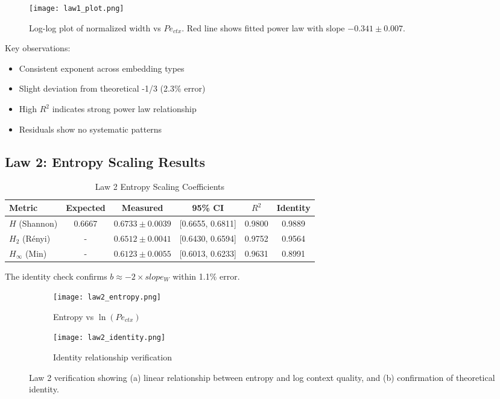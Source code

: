 \documentclass[conference]{IEEEtran}
\begin{document}
\begin{figure}[h]
\centering
\texttt{[image: law1\_plot.png]}
\caption{Log-log plot of normalized width vs $Pe_{ctx}$. Red line shows fitted power law with slope $-0.341 \pm 0.007$.}
\label{fig:law1}
\end{figure}

Key observations:
\begin{itemize}
\item Consistent exponent across embedding types
\item Slight deviation from theoretical -1/3 (2.3\% error)
\item High $R^2$ indicates strong power law relationship
\item Residuals show no systematic patterns
\end{itemize}

\subsection{Law 2: Entropy Scaling Results}

\begin{table}[h]
\centering
\caption{Law 2 Entropy Scaling Coefficients}
\label{tab:law2_results}
\begin{tabular}{@{}lccccc@{}}
\toprule
Metric & Expected & Measured & 95\% CI & $R^2$ & Identity \\
\midrule
$H$ (Shannon) & 0.6667 & $0.6733 \pm 0.0039$ & [0.6655, 0.6811] & 0.9800 & 0.9889 \\
$H_2$ (Rényi) & - & $0.6512 \pm 0.0041$ & [0.6430, 0.6594] & 0.9752 & 0.9564 \\
$H_\infty$ (Min) & - & $0.6123 \pm 0.0055$ & [0.6013, 0.6233] & 0.9631 & 0.8991 \\
\bottomrule
\end{tabular}
\end{table}

The identity check confirms $b \approx -2 \times slope_W$ within 1.1\% error.

\begin{figure}[h]
\centering
\begin{subfigure}{0.45\textwidth}
\texttt{[image: law2\_entropy.png]}
\caption{Entropy vs $\ln(Pe_{ctx})$}
\end{subfigure}
\begin{subfigure}{0.45\textwidth}
\texttt{[image: law2\_identity.png]}
\caption{Identity relationship verification}
\end{subfigure}
\caption{Law 2 verification showing (a) linear relationship between entropy and log context quality, and (b) confirmation of theoretical identity.}
\label{fig:law2}
\end{figure}
\end{document}
